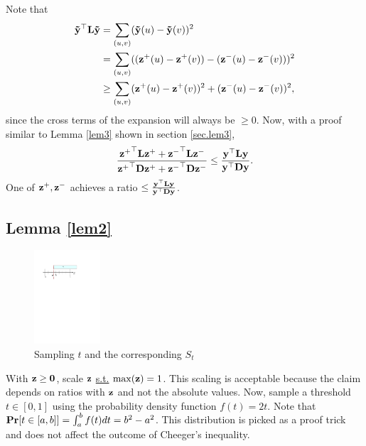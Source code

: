 \documentclass[11pt]{article}
\begin{document}
Note that
\begin{align*}
\V{\tilde{y}}^{\top}\V{L}\V{\tilde{y}} &= \sum_{(u,v)} (\V{\tilde{y}}(u) - \V{\tilde{y}}(v))^2 \\
&= \sum_{(u,v)} ( (\V{z^+}(u) - \V{z^+}(v)) - (\V{z^-}(u) - \V{z^-}(v)) )^2 \\
&\geq \sum_{(u,v)} (\V{z^+}(u) - \V{z^+}(v))^2 +  (\V{z^-}(u) - \V{z^-}(v))^2, \\
\end{align*}
since the cross terms of the expansion will always be $\geq 0$. Now, with a proof similar to Lemma \ref{lem3} shown in section \ref{sec.lem3}, 
\begin{equation*}
\dfrac{\V{z^+}^{\top}\V{L}\V{z^+}+\V{z^-}^{\top}\V{L}\V{z^-}}{\V{z^+}^{\top}\V{D}\V{z^+}+\V{z^-}^{\top}\V{D}\V{z^-}} \leq \dfrac{\V{y}^{\top}\V{L}\V{y}}{\V{y}^{\top}\V{D}\V{y}}.
\end{equation*}
One of $\V{z^+}, \V{z^-}$ achieves a ratio $\leq \frac{\V{y}^{\top}\V{L}\V{y}}{\V{y}^{\top}\V{D}\V{y}}$.

\subsection{Lemma \ref{lem2}}

\begin{figure}
\centering
\includegraphics[width=0.22\textwidth]{images/lemma2}
\caption{Sampling $t$ and the corresponding $S_t$}
\label{fig.lemma2}
\end{figure}

With $\V{z} \geq \V{0}$, scale $\V{z}$ \underline{s.t.} $\max(\V{z})=1$. This scaling is acceptable because the claim depends on ratios with $\V{z}$ and not the absolute values. Now, sample a threshold $t \in [0,1]$ using the probability density function $f(t) = 2t$. Note that $\operatorname*{\bf Pr}[t \in [a,b]] = \int_{a}^{b}f(t) dt = b^2 - a^2$. This distribution is picked as a proof trick and does not affect the outcome of Cheeger's inequality. 
\end{document}
